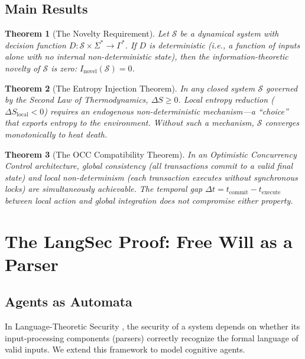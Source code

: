 \documentclass[12pt, a4paper]{article}
\theoremstyle{plain}
\newtheorem{theorem}{Theorem}[section]
\theoremstyle{definition}
\theoremstyle{remark}
\newcommand{\calS}{\mathcal{S}}
\begin{document}
\subsection{Main Results}

\begin{theorem}[The Novelty Requirement]\label{thm:novelty}
  Let $\calS$ be a dynamical system with decision function
  $D: \calS \times \Sigma^* \to \Gamma^*$. If $D$ is deterministic
  (i.e., a function of inputs alone with no internal non-deterministic
  state), then the information-theoretic novelty of $\calS$ is zero:
  $I_{\text{novel}}(\calS) = 0$.
\end{theorem}

\begin{theorem}[The Entropy Injection Theorem]\label{thm:entropy}
  In any closed system $\calS$ governed by the Second Law of Thermodynamics,
  $\Delta S \geq 0$. Local entropy reduction ($\Delta S_{\text{local}} < 0$)
  requires an endogenous non-deterministic mechanism---a ``choice'' that
  exports entropy to the environment. Without such a mechanism, $\calS$
  converges monotonically to heat death.
\end{theorem}

\begin{theorem}[The OCC Compatibility Theorem]\label{thm:occ}
  In an Optimistic Concurrency Control architecture, global consistency
  (all transactions commit to a valid final state) and local non-determinism
  (each transaction executes without synchronous locks) are simultaneously
  achievable. The temporal gap $\Delta t = t_{\text{commit}} - t_{\text{execute}}$
  between local action and global integration does not compromise either property.
\end{theorem}

\section{The LangSec Proof: Free Will as a Parser}\label{sec:langsec}

\subsection{Agents as Automata}

In Language-Theoretic Security \citep{Bratus2014}, the security of a system
depends on whether its input-processing components (parsers) correctly
recognize the formal language of valid inputs. We extend this framework to
model cognitive agents.
\end{document}

